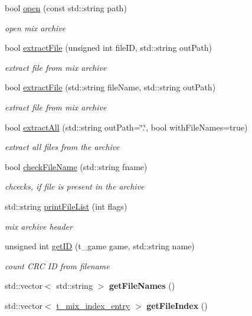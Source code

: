 \begin{DoxyCompactItemize}
\item 
bool \hyperlink{class_mix_file_a34cecccdab75e6533ed3cec0aaa1eae1}{open} (const std::string path)
\begin{DoxyCompactList}\small\item\em open mix archive \end{DoxyCompactList}\item 
bool \hyperlink{class_mix_file_a458c3723fe0f985a61e2063568f872fb}{extractFile} (unsigned int fileID, std::string outPath)
\begin{DoxyCompactList}\small\item\em extract file from mix archive \end{DoxyCompactList}\item 
bool \hyperlink{class_mix_file_a05fa448bc3507d58b85cfa3831c2f3b2}{extractFile} (std::string fileName, std::string outPath)
\begin{DoxyCompactList}\small\item\em extract file from mix archive \end{DoxyCompactList}\item 
bool \hyperlink{class_mix_file_a2016aa142da853224c86ef7aa17ef657}{extractAll} (std::string outPath=\char`\"{}.\char`\"{}, bool withFileNames=true)
\begin{DoxyCompactList}\small\item\em extract all files from the archive \end{DoxyCompactList}\item 
bool \hyperlink{class_mix_file_aa3c889a76f66b8508d38d63ccba3412b}{checkFileName} (std::string fname)
\begin{DoxyCompactList}\small\item\em chcecks, if file is present in the archive \end{DoxyCompactList}\item 
std::string \hyperlink{class_mix_file_affce142f06eb96c8e677a174b584f08c}{printFileList} (int flags)
\begin{DoxyCompactList}\small\item\em mix archive header \end{DoxyCompactList}\item 
unsigned int \hyperlink{class_mix_file_ab93f997c8a613ba0bee8a3d9a28de01b}{getID} (t\_\-game game, std::string name)
\begin{DoxyCompactList}\small\item\em count CRC ID from filename \end{DoxyCompactList}\item 
\hypertarget{class_mix_file_ad8c1782e1f48f5c376df06775b95ed6c}{
std::vector$<$ std::string $>$ {\bfseries getFileNames} ()}
\label{class_mix_file_ad8c1782e1f48f5c376df06775b95ed6c}

\item 
\hypertarget{class_mix_file_ac2dba1a5450c5f16b3364fb369366d67}{
std::vector$<$ \hyperlink{structt__mix__index__entry}{t\_\-mix\_\-index\_\-entry} $>$ {\bfseries getFileIndex} ()}
\label{class_mix_file_ac2dba1a5450c5f16b3364fb369366d67}

\end{DoxyCompactItemize}


